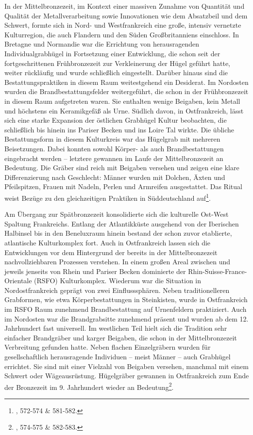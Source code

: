 \documentclass[openany,twoside,twocolumn]{book}
\let\rmarkdownfootnote\footnote%
\def\footnote{\protect\rmarkdownfootnote}
\begin{document}
In der Mittelbronzezeit, im Kontext einer massiven Zunahme von Quantität
und Qualität der Metallverarbeitung sowie Innovationen wie dem
Absatzbeil und dem Schwert, formte sich in Nord- und Westfrankreich eine
große, intensiv vernetzte Kulturregion, die auch Flandern und den Süden
Großbritanniens einschloss. In Bretagne und Normandie war die Errichtung
von herausragenden Individualgrabhügel in Fortsetzung einer Entwicklung,
die schon seit der fortgeschrittenen Frühbronzezeit zur Verkleinerung
der Hügel geführt hatte, weiter rückläufig und wurde schließlich
eingestellt. Darüber hinaus sind die Bestattungspraktiken in diesem Raum
weitestgehend ein Desiderat. Im Nordosten wurden die
Brandbestattungsfelder weitergeführt, die schon in der Frühbronzezeit in
diesem Raum aufgetreten waren. Sie enthalten wenige Beigaben, kein
Metall und höchstens ein Keramikgefäß als Urne. Südlich davon, in
Ostfrankreich, lässt sich eine starke Expansion der östlichen Grabhügel
Kultur beobachten, die schließlich bis hinein ins Pariser Becken und ins
Loire Tal wirkte. Die übliche Bestattungsform in diesem Kulturkreis war
das Hügelgrab mit mehreren Beisetzungen. Dabei konnten sowohl Körper-
als auch Brandbestattungen eingebracht werden -- letztere gewannen im
Laufe der Mittelbronzezeit an Bedeutung. Die Gräber sind reich mit
Beigaben versehen und zeigen eine klare Differenzierung nach Geschlecht:
Männer wurden mit Dolchen, Äxten und Pfeilspitzen, Frauen mit Nadeln,
Perlen und Armreifen ausgestattet. Das Ritual weist Bezüge zu den
gleichzeitigen Praktiken in Süddeutschland auf\footnote{\textcite{mordant_bronze_2013},
  572-574 \& 581-582.}.

Am Übergang zur Spätbronzezeit konsolidierte sich die kulturelle
Ost-West Spaltung Frankreichs. Entlang der Atlantikküste ausgehend von
der Iberischen Halbinsel bis in den Beneluxraum hinein bestand der schon
zuvor etablierte, atlantische Kulturkomplex fort. Auch in Ostfrankreich
lassen sich die Entwicklungen vor dem Hintergrund der bereits in der
Mittelbronzezeit nachvollziehbaren Prozessen verstehen. In einem großen
Areal zwischen und jeweils jenseits von Rhein und Pariser Becken
dominierte der Rhin-Suisse-France-Orientale (RSFO) Kulturkomplex.
Wiederum war die Situation in Nordostfrankreich geprägt von zwei
Einflusssphären. Neben traditionelleren Grabformen, wie etwa
Körperbestattungen in Steinkisten, wurde in Ostfrankreich im RSFO Raum
zunehmend Brandbestattung auf Urnenfeldern praktiziert. Auch im
Nordosten war die Brandgrabsitte zunehmend präsent und wurden ab dem 12.
Jahrhundert fast universell. Im westlichen Teil hielt sich die Tradition
sehr einfacher Brandgräber und karger Beigaben, die schon in der
Mittelbronzezeit Verbreitung gefunden hatte. Neben flachen Einzelgräbern
wurden für gesellschaftlich herausragende Individuen -- meist Männer --
auch Grabhügel errichtet. Sie sind mit einer Vielzahl von Beigaben
versehen, manchmal mit einem Schwert oder Wägeausrüstung. Hügelgräber
gewannen in Ostfrankreich zum Ende der Bronzezeit im 9. Jahrhundert
wieder an Bedeutung\footnote{\textcite{mordant_bronze_2013}, 574-575 \&
  582-583.}.
\end{document}
